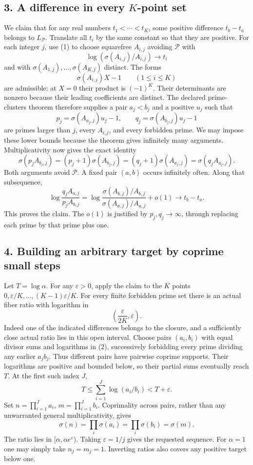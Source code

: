 \subsection*{3. A difference in every $K$-point set}
We claim that for any real numbers $t_1<\cdots<t_K$, some positive difference $t_b-t_a$ belongs to $L_{\mathcal P}$. Translate all $t_i$ by the same constant so that they are positive. For each integer $j$, use (1) to choose squarefree $A_{i,j}$ avoiding $\mathcal P$ with
\[
 \log(\sigma(A_{i,j})/A_{i,j})\longrightarrow t_i
\]
and with $\sigma(A_{1,j}),\ldots,\sigma(A_{K,j})$ distinct. The forms
\[
 \sigma(A_{i,j})X-1\qquad(1\le i\le K)
\]
are admissible: at $X=0$ their product is $(-1)^K$. Their determinants are nonzero because their leading coefficients are distinct. The declared prime-clusters theorem therefore supplies a pair $a_j<b_j$ and a positive $u_j$ such that
\[
 p_j=\sigma(A_{a_j,j})u_j-1,\qquad
 q_j=\sigma(A_{b_j,j})u_j-1
\]
are primes larger than $j$, every $A_{i,j}$, and every forbidden prime. We may impose these lower bounds because the theorem gives infinitely many arguments. Multiplicativity now gives the exact identity
\[
 \sigma(p_jA_{b_j,j})=(p_j+1)\sigma(A_{b_j,j})
 =(q_j+1)\sigma(A_{a_j,j})=\sigma(q_jA_{a_j,j}).
\]
Both arguments avoid $\mathcal P$. A fixed pair $(a,b)$ occurs infinitely often. Along that subsequence,
\[
 \log\frac{q_jA_{a,j}}{p_jA_{b,j}}
 =\log\frac{\sigma(A_{b,j})/A_{b,j}}{\sigma(A_{a,j})/A_{a,j}}+o(1)
 \longrightarrow t_b-t_a.
\]
This proves the claim. The $o(1)$ is justified by $p_j,q_j\to\infty$, through replacing each prime by that prime plus one.
\subsection*{4. Building an arbitrary target by coprime small steps}
Let $T=\log\alpha$. For any $\varepsilon>0$, apply the claim to the $K$ points $0,\varepsilon/K,\ldots,(K-1)\varepsilon/K$. For every finite forbidden prime set there is an actual fiber ratio with logarithm in
\[
 \left(\frac{\varepsilon}{2K},\varepsilon\right).             \tag{2}
\]
Indeed one of the indicated differences belongs to the closure, and a sufficiently close actual ratio lies in this open interval.
Choose pairs $(a_i,b_i)$ with equal divisor sums and logarithms in (2), successively forbidding every prime dividing any earlier $a_jb_j$. Thus different pairs have pairwise coprime supports. Their logarithms are positive and bounded below, so their partial sums eventually reach $T$. At the first such index $J$,
\[
 T\le\sum_{i=1}^J\log(a_i/b_i)<T+\varepsilon.
\]
Set $n=\prod_{i=1}^Ja_i$, $m=\prod_{i=1}^Jb_i$. Coprimality across pairs, rather than any unwarranted general multiplicativity, gives
\[
 \sigma(n)=\prod_i\sigma(a_i)=\prod_i\sigma(b_i)=\sigma(m).
\]
The ratio lies in $[\alpha,\alpha e^\varepsilon)$. Taking $\varepsilon=1/j$ gives the requested sequence. For $\alpha=1$ one may simply take $n_j=m_j=1$. Inverting ratios also covers any positive target below one.
